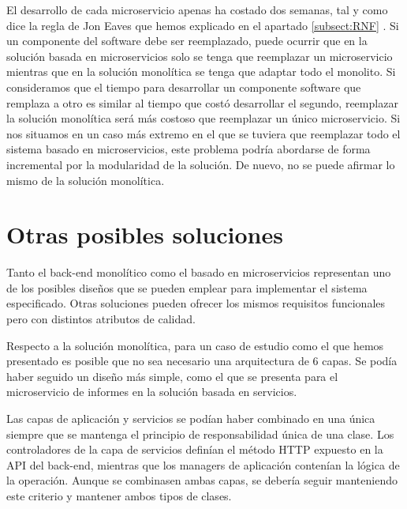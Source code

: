 \documentclass[11pt,spanish,listoffigures]{tfgetsinf}
\begin{document}
El desarrollo de cada microservicio apenas ha costado dos semanas, tal y como dice la regla de Jon Eaves que hemos explicado en el apartado \ref{subsect:RNF} . Si un componente del software debe ser reemplazado, puede ocurrir que en la solución basada en microservicios solo se tenga que reemplazar un microservicio mientras que en la solución monolítica se tenga que adaptar todo el monolito. Si consideramos que el tiempo para desarrollar un componente software que remplaza a otro es similar al tiempo que costó desarrollar el segundo, reemplazar la solución monolítica será más costoso que reemplazar un único microservicio. Si nos situamos en un caso más extremo en el que se tuviera que reemplazar todo el sistema basado en microservicios, este problema podría abordarse de forma incremental por la modularidad de la solución. De nuevo, no se puede afirmar lo mismo de la solución monolítica.

\section{Otras posibles soluciones}

Tanto el back-end monolítico como el basado en microservicios representan uno de los posibles diseños que se pueden emplear para implementar el sistema especificado. Otras soluciones pueden ofrecer los mismos requisitos funcionales pero con distintos atributos de calidad.

Respecto a la solución monolítica, para un caso de estudio como el que hemos presentado es posible que no sea necesario una arquitectura de 6 capas. Se podía haber seguido un diseño más simple, como el que se presenta para el microservicio de informes en la solución basada en servicios. 

Las capas de aplicación y servicios se podían haber combinado en una única siempre que se mantenga el principio de responsabilidad única de una clase. Los controladores de la capa de servicios definían el método HTTP expuesto en la API del back-end, mientras que los managers de aplicación contenían la lógica de la operación. Aunque se combinasen ambas capas, se debería seguir manteniendo este criterio y mantener ambos tipos de clases.
\end{document}
